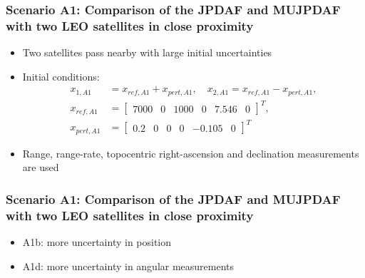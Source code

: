 \documentclass[hyperref={pdftex,pdfpagemode=none,pdfstartview=FitH},10pt]{beamer}
\begin{document}
\begin{frame}
\frametitle{Scenario A1: Comparison of the JPDAF and MUJPDAF with two LEO satellites in close proximity}


\begin{itemize}
\item Two satellites pass nearby with large initial uncertainties
\item Initial conditions:
\begin{align}
x_{1,A1}&=x_{ref,A1}+x_{pert,A1}, \quad x_{2,A1}=x_{ref,A1}-x_{pert,A1},\nonumber
\\
x_{ref,A1}&=\begin{bmatrix}7000 & 0 & 1000 & 0 & 7.546 & 0\end{bmatrix}^T,
\\
x_{pert,A1}&=\begin{bmatrix}
0.2 & 0 & 0 & 0 & -0.105 & 0
\end{bmatrix}^T\nonumber
\end{align}
\item Range, range-rate, topocentric right-ascension and declination measurements are used
\end{itemize}


\end{frame}

\begin{frame}
\frametitle{Scenario A1: Comparison of the JPDAF and MUJPDAF with two LEO satellites in close proximity}


\begin{itemize}
\item A1b: more uncertainty in position
\item A1d: more uncertainty in angular measurements
\end{itemize}

\begin{figure}
\centerline{
}
\centerline{
}
\caption{}
\end{figure}

\end{frame}
\end{document}
